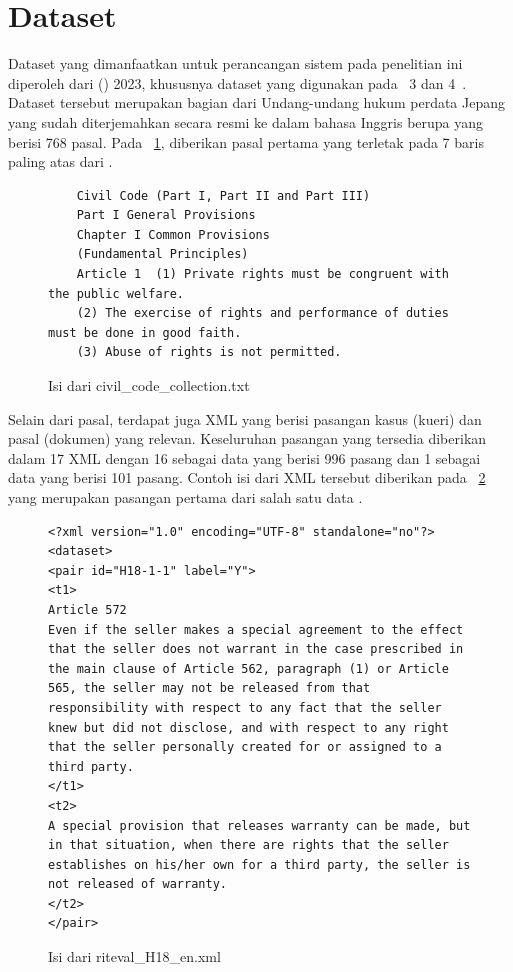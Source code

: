 \section{Dataset}
\label{subbab:3:Dataset}
Dataset yang dimanfaatkan untuk perancangan sistem \ir{} pada penelitian ini diperoleh dari \coliee{} (\COLIEE{}) 2023, khususnya dataset yang digunakan pada \task{}~3 dan 4~\citep{goebel2023summary}. Dataset tersebut merupakan bagian dari Undang-undang hukum perdata Jepang yang sudah diterjemahkan secara resmi ke dalam bahasa Inggris berupa \txt{} \file{} yang berisi 768 pasal. Pada \gambar{}~\ref{gambar:TextFile}, diberikan pasal pertama yang terletak pada 7 baris paling atas dari \file{} \txt{}.
\begin{figure}[!ht]
    \centering
    \begin{lstlisting}
    Civil Code (Part I, Part II and Part III)
    Part I General Provisions
    Chapter I Common Provisions
    (Fundamental Principles)
    Article 1  (1) Private rights must be congruent with the public welfare.
    (2) The exercise of rights and performance of duties must be done in good faith.
    (3) Abuse of rights is not permitted.\end{lstlisting}
    \caption{Isi dari \file{} civil\_code\_collection.txt}
    \label{gambar:TextFile}
\end{figure}

Selain dari \file{} pasal, terdapat juga \file{} XML yang berisi pasangan kasus (kueri) dan pasal (dokumen) yang relevan. Keseluruhan pasangan yang tersedia diberikan dalam 17 XML \file{} dengan 16 \file{} sebagai data \training{} yang berisi 996 pasang dan 1 \file{} sebagai data \testing{} yang berisi 101 pasang. Contoh isi dari \file{} XML tersebut diberikan pada \gambar{}~\ref{gambar:XMLFile} yang merupakan pasangan pertama dari salah satu \file{} data \training{}.
\begin{figure}[!ht]
    \centering
    \begin{lstlisting}
<?xml version="1.0" encoding="UTF-8" standalone="no"?>
<dataset>
<pair id="H18-1-1" label="Y">
<t1>
Article 572
Even if the seller makes a special agreement to the effect that the seller does not warrant in the case prescribed in the main clause of Article 562, paragraph (1) or Article 565, the seller may not be released from that responsibility with respect to any fact that the seller knew but did not disclose, and with respect to any right that the seller personally created for or assigned to a third party.
</t1>
<t2>
A special provision that releases warranty can be made, but in that situation, when there are rights that the seller establishes on his/her own for a third party, the seller is not released of warranty.
</t2>
</pair>\end{lstlisting}
    \caption{Isi dari \file{} riteval\_H18\_en.xml}
    \label{gambar:XMLFile}
\end{figure}

